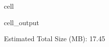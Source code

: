 \documentclass[letterpaper,10pt,english]{jupyterBook}
\begin{document}
\begin{sphinxuseclass}{cell}
\begin{sphinxVerbatimOutput}
\begin{sphinxuseclass}{cell_output}
\begin{sphinxVerbatim}[commandchars=\\\{\}]
Estimated Total Size (MB): 17.45
\PYGZhy{}\PYGZhy{}\PYGZhy{}\PYGZhy{}\PYGZhy{}\PYGZhy{}\PYGZhy{}\PYGZhy{}\PYGZhy{}\PYGZhy{}\PYGZhy{}\PYGZhy{}\PYGZhy{}\PYGZhy{}\PYGZhy{}\PYGZhy{}\PYGZhy{}\PYGZhy{}\PYGZhy{}\PYGZhy{}\PYGZhy{}\PYGZhy{}\PYGZhy{}\PYGZhy{}\PYGZhy{}\PYGZhy{}\PYGZhy{}\PYGZhy{}\PYGZhy{}\PYGZhy{}\PYGZhy{}\PYGZhy{}\PYGZhy{}\PYGZhy{}\PYGZhy{}\PYGZhy{}\PYGZhy{}\PYGZhy{}\PYGZhy{}\PYGZhy{}\PYGZhy{}\PYGZhy{}\PYGZhy{}\PYGZhy{}\PYGZhy{}\PYGZhy{}\PYGZhy{}\PYGZhy{}\PYGZhy{}\PYGZhy{}\PYGZhy{}\PYGZhy{}\PYGZhy{}\PYGZhy{}\PYGZhy{}\PYGZhy{}\PYGZhy{}\PYGZhy{}\PYGZhy{}\PYGZhy{}\PYGZhy{}\PYGZhy{}\PYGZhy{}\PYGZhy{}
\end{sphinxVerbatim}

\end{sphinxuseclass}\end{sphinxVerbatimOutput}

\end{sphinxuseclass}
\end{document}
